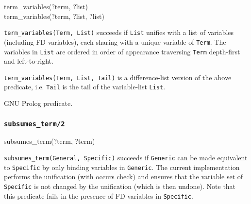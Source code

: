 \label{term_variables/2-3}

\begin{TemplatesOneCol}
term\_variables(?term, ?list)\\
term\_variables(?term, ?list, ?list)\\

\end{TemplatesOneCol}

\Description

\texttt{term\_variables(Term, List)} succeeds if \texttt{List} unifies with a
list of variables (including FD variables), each sharing with a unique
variable of \texttt{Term}. The variables in \texttt{List} are ordered in
order of appearance traversing \texttt{Term} depth-first and left-to-right.

\texttt{term\_variables(Term, List, Tail)} is a difference-list version of the above predicate, i.e. \texttt{Tail} is the tail of the variable-list \texttt{List}.

\begin{PlErrors}


\end{PlErrors}


\Portability

GNU Prolog predicate.

\subsubsection{\texttt{subsumes\_term/2}}

\begin{TemplatesOneCol}
subsumes\_term(?term, ?term)

\end{TemplatesOneCol}

\Description

\texttt{subsumes\_term(General, Specific)} succeeds if \texttt{Generic} can
be made equivalent to \texttt{Specific} by only binding variables in
\texttt{Generic}. The current implementation performs the unification (with
occurs check) and ensures that the variable set of \texttt{Specific} is not
changed by the unification (which is then undone). Note that this predicate
fails in the presence of FD variables in \texttt{Specific}.

\PlErrorsNone

\Portability

